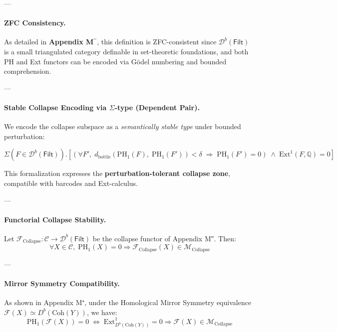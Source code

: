 \documentclass[11pt]{article}
\begin{document}
\begin{axiom}
\begin{axiom}
{{---

\paragraph{ZFC Consistency.}  
As detailed in \textbf{Appendix M$^{\prime\prime}$}, this definition is ZFC-consistent  
since \( \mathcal{D}^b(\mathsf{Filt}) \) is a small triangulated category definable in set-theoretic foundations,  
and both PH and Ext functors can be encoded via Gödel numbering and bounded comprehension.

---

\paragraph{Stable Collapse Encoding via $\Sigma$-type (Dependent Pair).}

We encode the collapse subspace as a \emph{semantically stable type} under bounded perturbation:

\[
\Sigma \left( F \in \mathcal{D}^b(\mathsf{Filt}) \right). \left[
\left(
\forall F',\;
d_{\mathrm{bottle}}(\mathrm{PH}_1(F),\; \mathrm{PH}_1(F')) < \delta \;\Rightarrow\; \mathrm{PH}_1(F') = 0
\right)
\;\land\;
\mathrm{Ext}^1(F, \mathbb{Q}) = 0
\right]
\]

This formalization expresses the \textbf{perturbation-tolerant collapse zone},  
compatible with barcodes and Ext-calculus.

---

\paragraph{Functorial Collapse Stability.}  
Let \( \mathcal{F}_{\mathrm{Collapse}} : \mathcal{C} \to \mathcal{D}^b(\mathsf{Filt}) \)  
be the collapse functor of Appendix M″.  
Then:
\[
\forall X \in \mathcal{C},\;
\mathrm{PH}_1(X) = 0 \Rightarrow \mathcal{F}_{\mathrm{Collapse}}(X) \in \mathcal{M}_{\mathrm{Collapse}}
\]

---

\paragraph{Mirror Symmetry Compatibility.}  
As shown in Appendix M⁺, under the Homological Mirror Symmetry equivalence  
\( \mathcal{F}(X) \simeq D^b(\mathrm{Coh}(Y)) \), we have:
\[
\mathrm{PH}_1(\mathcal{F}(X)) = 0 \;\Leftrightarrow\; \mathrm{Ext}^1_{D^b(\mathrm{Coh}(Y))} = 0
\Rightarrow \mathcal{F}(X) \in \mathcal{M}_{\mathrm{Collapse}}
\]

}}
\end{axiom}
\end{axiom}
\end{document}

